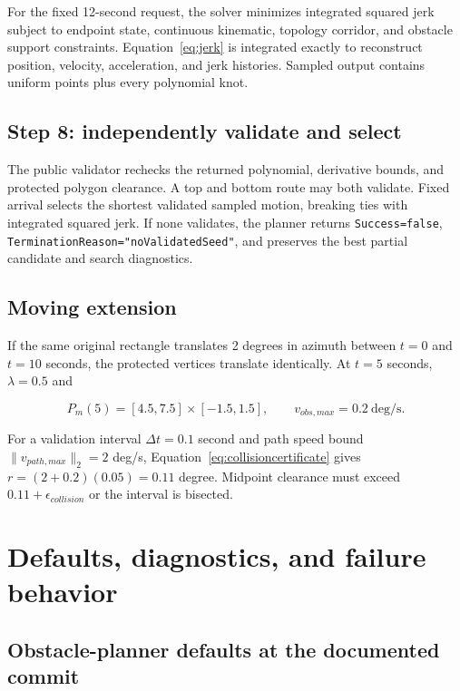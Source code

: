 \documentclass[10pt,letterpaper]{article}
\newcommand{\file}[1]{\nolinkurl{#1}}
\begin{document}
For the fixed 12-second request, the solver minimizes integrated squared jerk
subject to endpoint state, continuous kinematic, topology corridor, and
obstacle support constraints. Equation~\eqref{eq:jerk} is integrated exactly
to reconstruct position, velocity, acceleration, and jerk histories. Sampled
output contains uniform points plus every polynomial knot.

\subsection{Step 8: independently validate and select}

The public validator rechecks the returned polynomial, derivative bounds, and
protected polygon clearance. A top and bottom route may both validate. Fixed
arrival selects the shortest validated sampled motion, breaking ties with
integrated squared jerk. If none validates, the planner returns
\file{Success=false}, \file{TerminationReason="noValidatedSeed"}, and preserves
the best partial candidate and search diagnostics.

\subsection{Moving extension}

If the same original rectangle translates 2 degrees in azimuth between
$t=0$ and $t=10$ seconds, the protected vertices translate identically. At
$t=5$ seconds, $\lambda=0.5$ and

\begin{equation}
P_m(5)=[4.5,7.5]\times[-1.5,1.5],\qquad v_{obs,max}=0.2\ \mathrm{deg/s}.
\end{equation}

For a validation interval $\Delta t=0.1$ second and path speed bound
$\lVert v_{path,max}\rVert_2=2$ deg/s, Equation~\eqref{eq:collisioncertificate}
gives $r=(2+0.2)(0.05)=0.11$ degree. Midpoint clearance must exceed
$0.11+\epsilon_{collision}$ or the interval is bisected.

\section{Defaults, diagnostics, and failure behavior}

\subsection{Obstacle-planner defaults at the documented commit}
\end{document}
